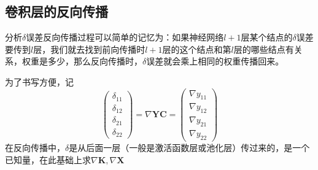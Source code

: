 \subsection{卷积层的反向传播}
分析$\delta$误差反向传播过程可以简单的记忆为：如果神经网络$l+1$层某个结点的$\delta$误差要传到$l$层，我们就去找到前向传播时$l+1$层的这个结点和第$l$层的哪些结点有关系，权重是多少，那么反向传播时，$\delta$误差就会乘上相同的权重传播回来。

为了书写方便，记
\begin{equation}
	\begin{pmatrix}
		\delta_{11}\\ 
		\delta_{12}\\ 
		\delta_{21}\\ 
		\delta_{22}
	\end{pmatrix}=\nabla \boldsymbol{YC} = 
	\begin{pmatrix}
		\nabla y_{11}\\ 
		\nabla y_{12}\\ 
		\nabla y_{21}\\ 
		\nabla y_{22}
	\end{pmatrix}
\end{equation}
在反向传播中，$\delta$是从后面一层（一般是激活函数层或池化层）传过来的，是一个已知量，在此基础上求$\nabla \boldsymbol{K}, \nabla \boldsymbol{X}$
